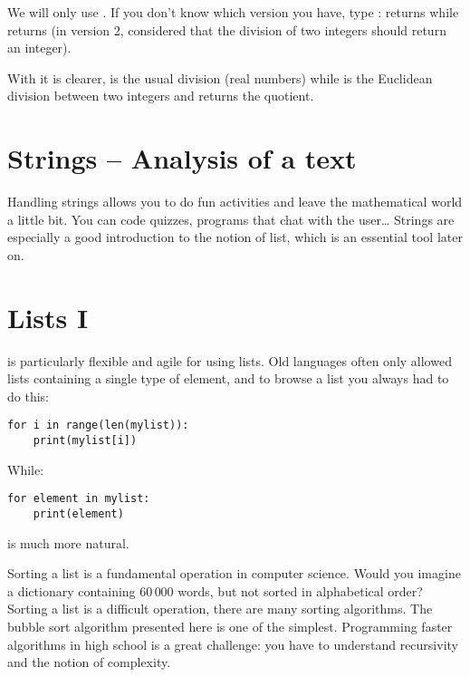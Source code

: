 \documentclass[11pt,class=report,crop=false]{standalone}
\begin{document}
We will only use . If you don't know which version you have, type
:  returns  while  returns  (in version 2, \Python{} considered that the division of two integers should return an integer).

With  it is clearer,  is the usual division (real numbers) while  is the Euclidean division between two integers and returns the quotient.


\section{Strings -- Analysis of a text}

Handling strings allows you to do fun activities and leave the mathematical world a little bit. You can code quizzes, programs that chat with the user\ldots{}
Strings are especially a good introduction to the notion of list, which is an essential tool later on.



\section{Lists I}

\Python{} is particularly flexible and agile for using lists.
\og{}Old\fg{} languages often only allowed lists containing a single type of element, and to browse a list you always had to do this:
\begin{lstlisting}
for i in range(len(mylist)):
    print(mylist[i])
\end{lstlisting}  
While:
\begin{lstlisting}
for element in mylist:
    print(element)
\end{lstlisting} 
is much more natural.

Sorting a list is a fundamental operation in computer science. Would you imagine a dictionary containing $60\,000$ words, but not sorted in alphabetical order?
Sorting a list is a difficult operation, there are many sorting algorithms. The bubble sort algorithm presented here is one of the simplest. Programming faster algorithms in high school is a great challenge: you have to understand recursivity and the notion of complexity.
\end{document}
